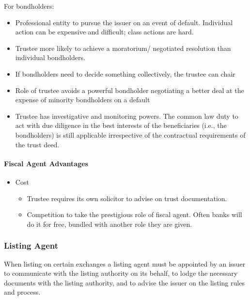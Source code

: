 \documentclass[
]{article}
\providecommand{\tightlist}{%
  \setlength{\itemsep}{0pt}\setlength{\parskip}{0pt}}
\begin{document}
For bondholders:

\begin{itemize}
\tightlist
\item
  Professional entity to pursue the issuer on an event of default.
  Individual action can be expensive and difficult; class actions are
  hard.
\item
  Trustee more likely to achieve a moratorium/ negotiated resolution
  than individual bondholders.
\item
  If bondholders need to decide something collectively, the trustee can
  chair
\item
  Role of trustee avoids a powerful bondholder negotiating a better deal
  at the expense of minority bondholders on a default
\item
  Trustee has investigative and monitoring powers. The common law duty
  to act with due diligence in the best interests of the beneficiaries
  (i.e., the bondholders) is still applicable irrespective of the
  contractual requirements of the trust deed.
\end{itemize}

\hypertarget{fiscal-agent-advantages}{%
\paragraph{Fiscal Agent Advantages}\label{fiscal-agent-advantages}}

\begin{itemize}
\tightlist
\item
  Cost

  \begin{itemize}
  \tightlist
  \item
    Trustee requires its own solicitor to advise on trust documentation.
  \item
    Competition to take the prestigious role of fiscal agent. Often
    banks will do it for free, bundled with another role they are given.
  \end{itemize}
\end{itemize}

\hypertarget{listing-agent}{%
\subsubsection{Listing Agent}\label{listing-agent}}

When listing on certain exchanges a listing agent must be appointed by
an issuer to communicate with the listing authority on its behalf, to
lodge the necessary documents with the listing authority, and to advise
the issuer on the listing rules and process.
\end{document}
